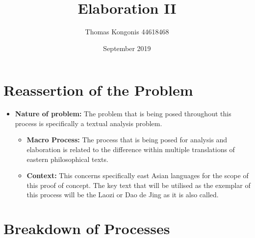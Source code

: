 \documentclass{article}
\title{Elaboration II}
\author{Thomas Kongonis 44618468}
\date{September 2019}
\begin{document}
\maketitle
\tableofcontents

\section{Reassertion of the Problem}

\begin{itemize}

\item{\textbf{Nature of problem:} The problem that is being posed throughout this process is specifically a textual
analysis problem.}

\begin{itemize}

\item{\textbf{Macro Process:} The process that is being posed for analysis and elaboration is related to the difference within multiple translations of eastern philosophical texts.}

\item{\textbf{Context:} This concerns specifically east Asian languages for the scope of this proof of concept. The key text that will be utilised as the exemplar of this process will be the Laozi or Dao de Jing as it is also called.}

\end{itemize}

\end{itemize}


\section{Breakdown of Processes}
\end{document}
